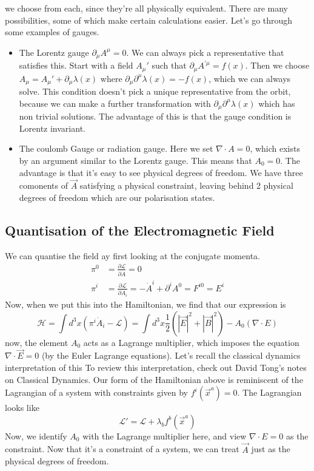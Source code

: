 we choose from each, since they're all 
physically equivalent.
There are many possibilities, some of which make 
certain calculations easier.
Let's go through some examples of gauges. 
\begin{itemize}
	\item The Lorentz gauge $ \partial  _ \mu A ^ \mu = 0 $. 
		We can always pick a representative that 
		satisfies this. 
		Start with a field $ A _ \mu ' $ such that $\partial _ \mu A ^{' \mu }  = f ( x) $. 
		Then we choose $A _ \mu  = A _ \mu ' + \partial  _ \mu \lambda ( x) $ where 
		$ \partial  _ \mu \partial  ^ \mu \lambda ( x)  = - f ( x ) $, 
		which we can always solve. 
		This condition doesn't pick a unique representative 
		from the orbit, because we can make a further transformation 
		with $ \partial  _ \mu \partial  ^ \mu \lambda ( x) $ 
		which has non trivial solutions. The advantage 
		of this is that the gauge condition is Lorentz invariant. 
        \item The coulomb Gauge or radiation gauge. 
		Here we set $\nabla \cdot  A = 0 $, 
		which exists by an argument similar to the Lorentz gauge. 
		This means that $ A_0  = 0 $. The advantage 
		is that it's easy to see physical degrees of freedom. 
		We have three comonents of $\vec{A} $ satisfying a physical constraint, 
		leaving behind 2 physical degrees of freedom which are our polarisation states. 
\end{itemize}

\subsection{Quantisation of the Electromagnetic Field} 
We can quantise the field 
ay first looking at the conjugate momenta. 
\begin{align*}
	\pi ^ 0 &=  \frac{\partial  \mathcal{ L } }{\partial  \dot { A } }   =0  \\
	\pi ^ i &=  \frac{\partial  \mathcal{ L } }{\partial  \dot{ A } _ i }   = 
	 - \dot{ A} ^ i + \partial  ^ i A ^ 0  = F ^{ i 0 }  = E ^ i 
\end{align*}
Now, when we 
put this into the Hamiltonian, we find that our expression is 
\[
	\mathcal{ H }  = \int  d^ 3 x \left( \pi ^ i \dot{ A } _ i - \mathcal{ L }  \right)  
	= \int d ^ 3 x \frac{1}{2 } \left( | \vec{E} | ^ 2 + | \vec{B} | ^ 2  \right)   - A _ 0 \left( \nabla 
	\cdot  E \right)  
\]  now, the element $ A _ 0 $ acts as a Lagrange multiplier, which imposes 
the equation $ \nabla \cdot  \vec{E} = 0 $ (by the Euler Lagrange equations). 
Let's recall the classical dynamics interpretation of this 
To review this interpretation, check out David Tong's
notes on Classical Dynamics. 
Our form of the Hamiltonian above is 
reminiscent of the Lagrangian of a system 
with constraints given by $ f ^ i ( \vec{x} ^ a )   = 0 $. 
The Lagrangian looks like 
\[
	\mathcal{ L }  '  = \mathcal{ L } + \lambda_b f ^ b ( \vec{x} ^ a ) 
\]  Now, we identify $  A_ 0 $ with the Lagrange 
multiplier here, and view $ \nabla  \cdot  E  =0 $  as the constraint. 
Now that it's a constraint of a system, we can treat $ \vec{A} $ just as 
the physical degrees of freedom. 

